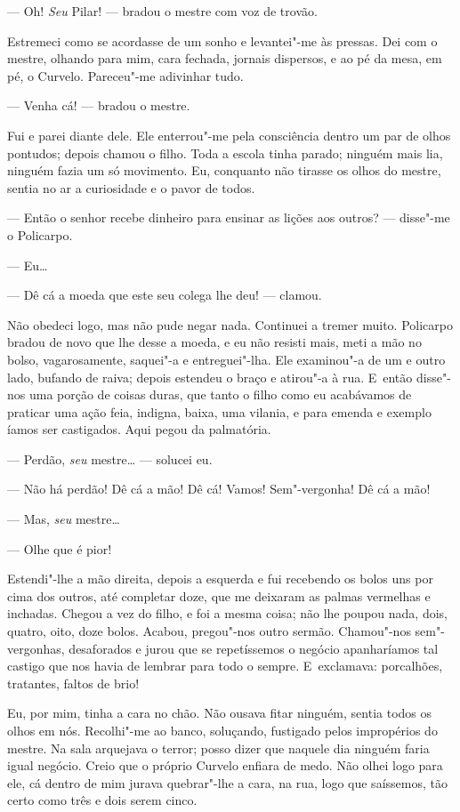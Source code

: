\begin{linenumbers}
--- Oh! \emph{Seu} Pilar! --- bradou o mestre com voz de trovão.

Estremeci como se acordasse de um sonho e levantei"-me às pressas. Dei
com o mestre, olhando para mim, cara fechada, jornais dispersos, e ao pé
da mesa, em pé, o Curvelo. Pareceu"-me adivinhar tudo.

--- Venha cá! --- bradou o mestre.

Fui e parei diante dele. Ele enterrou"-me pela consciência dentro um par
de olhos pontudos; depois chamou o filho. Toda a escola tinha parado;
ninguém mais lia, ninguém fazia um só movimento. Eu, conquanto não
tirasse os olhos do mestre, sentia no ar a curiosidade e o pavor de
todos.

--- Então o senhor recebe dinheiro para ensinar as lições aos outros? ---
disse"-me o Policarpo.

--- Eu\ldots{}

--- Dê cá a moeda que este seu colega lhe deu! --- clamou.

Não obedeci logo, mas não pude negar nada. Continuei a tremer muito.
Policarpo bradou de novo que lhe desse a moeda, e eu não resisti mais,
meti a mão no bolso, vagarosamente, saquei"-a e entreguei"-lha. Ele
examinou"-a de um e outro lado, bufando de raiva; depois estendeu o braço
e atirou"-a à rua. E~então disse"-nos uma porção de coisas duras, que
tanto o filho como eu acabávamos de praticar uma ação feia, indigna,
baixa, uma vilania, e para emenda e exemplo íamos ser castigados. Aqui
pegou da palmatória.

--- Perdão, \emph{seu} mestre\ldots{} --- solucei eu.

--- Não há perdão! Dê cá a mão! Dê cá! Vamos! Sem"-vergonha! Dê cá a mão!

--- Mas, \emph{seu} mestre\ldots{}

--- Olhe que é pior!

Estendi"-lhe a mão direita, depois a esquerda e fui recebendo os bolos
uns por cima dos outros, até completar doze, que me deixaram as palmas
vermelhas e inchadas. Chegou a vez do filho, e foi a mesma coisa; não
lhe poupou nada, dois, quatro, oito, doze bolos. Acabou, pregou"-nos
outro sermão. Chamou"-nos sem"-vergonhas, desaforados e jurou que se
repetíssemos o negócio apanharíamos tal castigo que nos havia de lembrar
para todo o sempre. E~exclamava: porcalhões, tratantes, faltos de brio!

Eu, por mim, tinha a cara no chão. Não ousava fitar ninguém, sentia
todos os olhos em nós. Recolhi"-me ao banco, soluçando, fustigado pelos
impropérios do mestre. Na sala arquejava o terror; posso dizer que
naquele dia ninguém faria igual negócio. Creio que o próprio Curvelo
enfiara de medo. Não olhei logo para ele, cá dentro de mim jurava
quebrar"-lhe a cara, na rua, logo que saíssemos, tão certo como três e
dois serem cinco.


\end{linenumbers}
